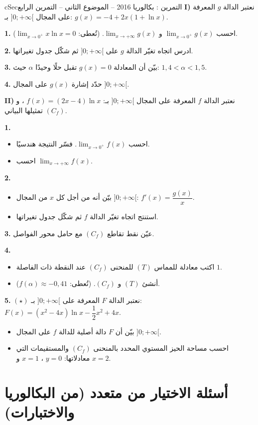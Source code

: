 \documentclass[12pt,a4paper]{article}
\newenvironment{BOX}[2]{\begin{otherlanguage}{english}\begin{arbox}{#1}{#2}}{\end{arbox}\end{otherlanguage}}
\newcounter{exo}
\newenvironment{tamrin}[1]{\stepcounter{exo}\begin{BOX}{cSec}{التمرين \theexo: #1}}{\end{BOX}}
\newenvironment{sq}{\begin{itemize}[leftmargin=2.4em,itemsep=3pt]}{\end{itemize}}
\newcommand{\qa}{\item[(أ)]}\newcommand{\qb}{\item[(ب)]}\newcommand{\qc}{\item[(جـ)]}\newcommand{\qd}{\item[(د)]}\newcommand{\qe}{\item[(هـ)]}
\newcommand{\QQ}[1]{\par\smallskip\textbf{#1.} }
\newcommand{\Lm}[1]{\displaystyle\lim_{x\to#1}}
\begin{document}
\begin{tamrin}{بكالوريا 2016 -- الموضوع الثاني -- التمرين الرابع}
\textbf{I)} نعتبر الدالة $g$ المعرفة على المجال $]0;+\infty[$ بـ: $g(x)=-4+2x(1+\ln x)$.
\QQ{1} احسب $\Lm{0^+}g(x)$ و $\Lm{+\infty}g(x)$. (تُعطى: $\Lm{0^+}x\ln x=0$).
\QQ{2} ادرس اتجاه تغيّر الدالة $g$ على $]0;+\infty[$ ثم شكّل جدول تغيراتها.
\QQ{3} بيّن أن المعادلة $g(x)=0$ تقبل حلًا وحيدًا $\alpha$ حيث: $1{,}4<\alpha<1{,}5$.
\QQ{4} حدّد إشارة $g(x)$ على المجال $]0;+\infty[$.\par
\textbf{II)} نعتبر الدالة $f$ المعرفة على المجال $]0;+\infty[$ بـ: $f(x)=(2x-4)\ln x$ ، و $(C_f)$ تمثيلها البياني.
\QQ{1}
\begin{sq}
\qa احسب $\Lm{0^+}f(x)$. فسّر النتيجة هندسيًا.
\qb احسب $\Lm{+\infty}f(x)$.
\end{sq}
\QQ{2}
\begin{sq}
\qa بيّن أنه من أجل كل $x$ من المجال $]0;+\infty[$: $f'(x)=\dfrac{g(x)}x$.
\qb استنتج اتجاه تغيّر الدالة $f$ ثم شكّل جدول تغيراتها.
\end{sq}
\QQ{3} عيّن نقط تقاطع $(C_f)$ مع حامل محور الفواصل.
\QQ{4}
\begin{sq}
\qa اكتب معادلة للمماس $(T)$ للمنحنى $(C_f)$ عند النقطة ذات الفاصلة $1$.
\qb أنشئ $(T)$ و $(C_f)$. (تُعطى: $f(\alpha)\approx-0{,}41$).
\end{sq}
\QQ{5} $(\star)$ نعتبر الدالة $F$ المعرفة على $]0;+\infty[$ بـ: $F(x)=\left(x^2-4x\right)\ln x-\dfrac12x^2+4x$.
\begin{sq}
\qa بيّن أن $F$ دالة أصلية للدالة $f$ على المجال $]0;+\infty[$.
\qb احسب مساحة الحيز المستوي المحدد بالمنحنى $(C_f)$ والمستقيمات التي معادلاتها: $y=0$ ، $x=1$ و $x=2$.
\end{sq}
\end{tamrin}

\section{أسئلة الاختيار من متعدد (من البكالوريا والاختبارات)}
\end{document}
